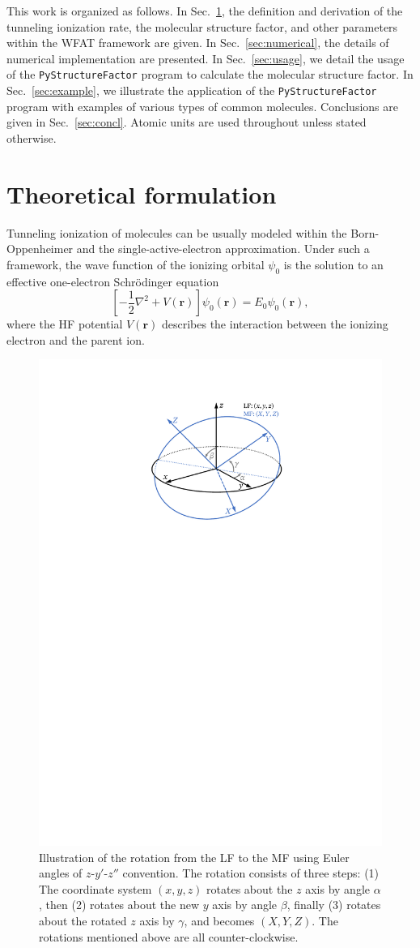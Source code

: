 \documentclass[preprint,12pt]{elsarticle} %
\newcommand{\bn}[1]{\mathbf{#1}}    %
\begin{document}
This work is organized as follows. In Sec.~\ref{sec:theory}, the definition and derivation of the tunneling ionization rate, the molecular structure factor, and other parameters within the WFAT framework are given. In Sec.~\ref{sec:numerical}, the details of numerical implementation are presented. In Sec.~\ref{sec:usage}, we detail the usage of the \texttt{PyStructureFactor} program to calculate the molecular structure factor. In Sec.~\ref{sec:example}, we illustrate the application of the \texttt{PyStructureFactor} program with examples of various types of common molecules. Conclusions are given in Sec.~\ref{sec:concl}. Atomic units are used throughout unless stated otherwise.


\section{Theoretical formulation}
\label{sec:theory}

Tunneling ionization of molecules can be usually modeled within the Born-Oppenheimer and the single-active-electron approximation. Under such a framework, the wave function of the ionizing orbital $\psi_0$ is the solution to an effective one-electron Schr\"{o}dinger equation
\begin{equation}
    \left[-\frac12\nabla^2 + V(\bn{r})\right] \psi_0(\bn{r}) = E_0 \psi_0(\bn{r}),
\end{equation}
where the HF potential $V(\bn{r})$ describes the interaction between the ionizing electron and the parent ion.

\begin{figure}[tb]
    \centering
    \includegraphics[width=0.5\columnwidth]{Euler_Angle_20230706.pdf}
    \caption{
        Illustration of the rotation from the LF to the MF using Euler angles of $z$-$y'$-$z''$ convention. The rotation consists of three steps: (1) The coordinate system $(x,y,z)$ rotates about the $z$ axis by angle $\alpha$, then (2) rotates about the new $y$ axis by angle $\beta$, finally (3) rotates about the rotated $z$ axis by $\gamma$, and becomes $(X,Y,Z)$. The rotations mentioned above are all counter-clockwise.
        }
    \label{fig:EulerAngle}
\end{figure}
\end{document}
